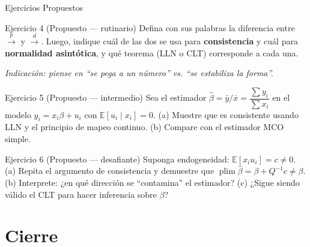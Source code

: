 \documentclass{beamer}
\DeclareMathOperator*{\plim}{plim}
\begin{document}
\begin{frame}{Ejercicios Propuestos}

\begin{block}{Ejercicio 4 (Propuesto — rutinario)}
Defina con sus palabras la diferencia entre $\overset{p}{\to}$ y $\overset{d}{\to}$. Luego, indique cuál de las dos se usa para \textbf{consistencia} y cuál para \textbf{normalidad asintótica}, y qué teorema (LLN o CLT) corresponde a cada una.
\end{block}
{\small \textit{Indicación: piense en ``se pega a un número'' vs. ``se estabiliza la forma''.}}

\pause

\begin{block}{Ejercicio 5 (Propuesto — intermedio)}
Sea el estimador $\hat{\beta}=\bar{y}/\bar{x}=\dfrac{\sum y_i}{\sum x_i}$ en el modelo $y_i=x_i\beta+u_i$ con $\mathbb{E}[u_i\mid x_i]=0$. (a) Muestre que es consistente usando LLN y el principio de mapeo continuo. (b) Compare con el estimador MCO simple.
\end{block}

\pause

\begin{block}{Ejercicio 6 (Propuesto — desafiante)}
Suponga endogeneidad: $\mathbb{E}[x_i u_i]=c\neq 0$. (a) Repita el argumento de consistencia y demuestre que $\plim\hat{\beta}=\beta + Q^{-1}c \neq \beta$. (b) Interprete: ¿en qué dirección se ``contamina'' el estimador? (c) ¿Sigue siendo válido el CLT para hacer inferencia sobre $\beta$?
\end{block}

\end{frame}

\section{Cierre}
\end{document}
